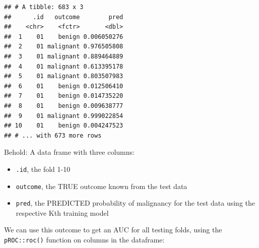 \documentclass[]{article}
\newenvironment{Shaded}{\begin{snugshade}}{\end{snugshade}}
\newcommand{\KeywordTok}[1]{\textcolor[rgb]{0.13,0.29,0.53}{\textbf{#1}}}
\newcommand{\DataTypeTok}[1]{\textcolor[rgb]{0.13,0.29,0.53}{#1}}
\newcommand{\StringTok}[1]{\textcolor[rgb]{0.31,0.60,0.02}{#1}}
\newcommand{\OperatorTok}[1]{\textcolor[rgb]{0.81,0.36,0.00}{\textbf{#1}}}
\newcommand{\NormalTok}[1]{#1}
\providecommand{\tightlist}{%
  \setlength{\itemsep}{0pt}\setlength{\parskip}{0pt}}
\begin{document}
\begin{Shaded}
\end{Shaded}

\begin{verbatim}
## # A tibble: 683 x 3
##      .id   outcome        pred
##    <chr>    <fctr>       <dbl>
##  1    01    benign 0.006050276
##  2    01 malignant 0.976505808
##  3    01 malignant 0.889464889
##  4    01 malignant 0.613395178
##  5    01 malignant 0.803507983
##  6    01    benign 0.012506410
##  7    01    benign 0.014735220
##  8    01    benign 0.009638777
##  9    01 malignant 0.999022854
## 10    01    benign 0.004247523
## # ... with 673 more rows
\end{verbatim}

Behold: A data frame with three columns:

\begin{itemize}
\tightlist
\item
  \texttt{.id}, the fold 1-10
\item
  \texttt{outcome}, the TRUE outcome known from the test data
\item
  \texttt{pred}, the PREDICTED probability of malignancy for the test
  data using the respective Kth training model
\end{itemize}

We can use this outcome to get an AUC for all testing folds, using the
\texttt{pROC::roc()} function on columns in the dataframe:

\begin{Shaded}
\end{Shaded}
\end{document}
